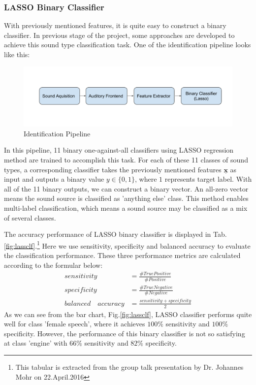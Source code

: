 \subsubsection*{LASSO Binary Classifier}
With previously mentioned features, it is quite easy to construct a binary classifier. In previous stage of the project, some approaches are developed to achieve this sound type classification task. One of the identification pipeline looks like this:

\begin{figure}[h!]
	\includegraphics[scale=0.5]{../image/chapter1/identification-pipeline.pdf}
	\caption{Identification Pipeline}
	\label{fig:id-pipeline}
\end{figure}

In this pipeline, 11 binary one-against-all classifiers using LASSO regression method are trained to accomplish this task. For each of these 11 classes of sound types, a corresponding classifier takes the previously mentioned features $\underline{\mathbf{x}}$ as input and outputs a binary value $y\in \lbrace0,1\rbrace$, where $1$ represents target label. With all of the 11 binary outputs, we can construct a binary vector. An all-zero vector means the sound source is classified as 'anything else' class. This method enables multi-label classification, which means a sound source may be classified as a mix of several classes. 

The accuracy performance of LASSO binary classifier is displayed in Tab.\ref{fig:lassclf}.\footnote{This tabular is extracted from the group talk presentation by Dr. Johannes Mohr on 22.April.2016}%
Here we use sensitivity, specificity and balanced accuracy to evaluate the classification performance. These three performance metrics are calculated according to the formular below:
\begin{align*}
	sensitivity &= \frac{\#TruePositive}{\#Positive}\\
	specificity &= \frac{\#TrueNegative}{\#Negative}\\
	balanced\quad accuracy &= \frac{sensitivity+specificity}{2}
\end{align*}
As we can see from the bar chart,  Fig.\ref{fig:lassclf}, LASSO classifier performs quite well for class 'female speech', where it achieves $100\%$ sensitivity and $100\%$ specificity. However, the performance of this binary classifier is not so satisfying at class 'engine' with $66\%$ sensitivity and $82\%$ specificity. 

